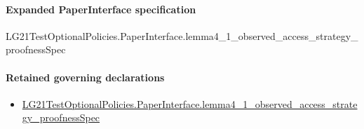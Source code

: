 \documentclass[10pt]{article}
\begin{document}
\paragraph{Expanded PaperInterface specification}
\begin{ReviewVerbatim}
LG21TestOptionalPolicies.PaperInterface.lemma4_1_observed_access_strategy_proofnessSpec
\end{ReviewVerbatim}

\paragraph{Retained governing declarations}
\begin{itemize}\raggedright
\item \hyperlink{governing-declaration-9b4e91413e72c7c3}{LG21\allowbreak{}Test\allowbreak{}Optional\allowbreak{}Policies.\allowbreak{}Paper\allowbreak{}Interface.\allowbreak{}lemma4\_\allowbreak{}1\_\allowbreak{}observed\_\allowbreak{}access\_\allowbreak{}strategy\_\allowbreak{}proofness\allowbreak{}Spec}
\end{itemize}
\end{document}
